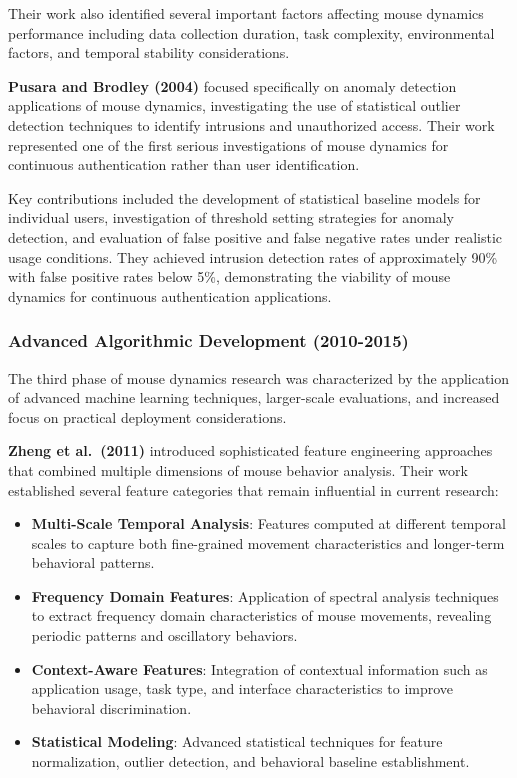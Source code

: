 \documentclass[
  12pt,
  a4paper,
]{report}
\begin{document}
Their work also identified several important factors affecting mouse
dynamics performance including data collection duration, task
complexity, environmental factors, and temporal stability
considerations.

\textbf{Pusara and Brodley (2004)} focused specifically on anomaly
detection applications of mouse dynamics, investigating the use of
statistical outlier detection techniques to identify intrusions and
unauthorized access. Their work represented one of the first serious
investigations of mouse dynamics for continuous authentication rather
than user identification.

Key contributions included the development of statistical baseline
models for individual users, investigation of threshold setting
strategies for anomaly detection, and evaluation of false positive and
false negative rates under realistic usage conditions. They achieved
intrusion detection rates of approximately 90\% with false positive
rates below 5\%, demonstrating the viability of mouse dynamics for
continuous authentication applications.

\subsubsection{Advanced Algorithmic Development
(2010-2015)}\label{advanced-algorithmic-development-2010-2015}

The third phase of mouse dynamics research was characterized by the
application of advanced machine learning techniques, larger-scale
evaluations, and increased focus on practical deployment considerations.

\textbf{Zheng et al.~(2011)} introduced sophisticated feature
engineering approaches that combined multiple dimensions of mouse
behavior analysis. Their work established several feature categories
that remain influential in current research:

\begin{itemize}
\item
  \textbf{Multi-Scale Temporal Analysis}: Features computed at different
  temporal scales to capture both fine-grained movement characteristics
  and longer-term behavioral patterns.
\item
  \textbf{Frequency Domain Features}: Application of spectral analysis
  techniques to extract frequency domain characteristics of mouse
  movements, revealing periodic patterns and oscillatory behaviors.
\item
  \textbf{Context-Aware Features}: Integration of contextual information
  such as application usage, task type, and interface characteristics to
  improve behavioral discrimination.
\item
  \textbf{Statistical Modeling}: Advanced statistical techniques for
  feature normalization, outlier detection, and behavioral baseline
  establishment.
\end{itemize}
\end{document}
